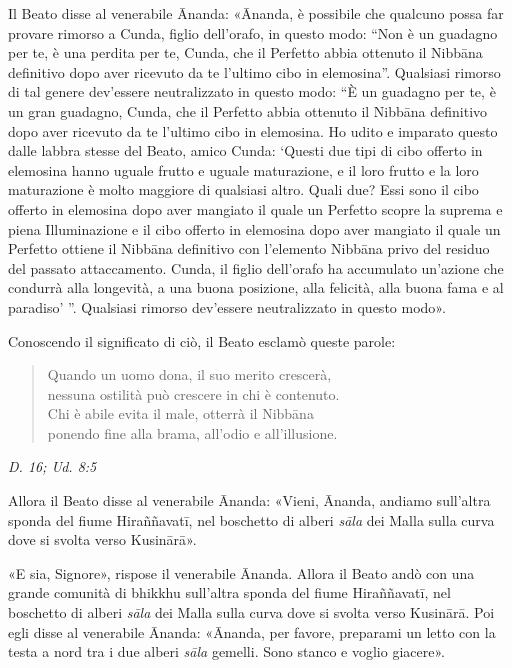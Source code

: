 Il Beato disse al venerabile Ānanda: «Ānanda, è possibile che qualcuno
possa far provare rimorso a Cunda, figlio dell’orafo, in questo modo:
“Non è un guadagno per te, è una perdita per te, Cunda, che il Perfetto
abbia ottenuto il Nibbāna definitivo dopo aver ricevuto da te l’ultimo
cibo in elemosina”. Qualsiasi rimorso di tal genere dev’essere
neutralizzato in questo modo: “È un guadagno per te, è un gran guadagno,
Cunda, che il Perfetto abbia ottenuto il Nibbāna definitivo dopo aver
ricevuto da te l’ultimo cibo in elemosina. Ho udito e imparato questo
dalle labbra stesse del Beato, amico Cunda: ‘Questi due tipi di cibo
offerto in elemosina hanno uguale frutto e uguale maturazione, e il loro
frutto e la loro maturazione è molto maggiore di qualsiasi altro. Quali
due? Essi sono il cibo offerto in elemosina dopo aver mangiato il quale
un Perfetto scopre la suprema e piena Illuminazione e il cibo offerto in
elemosina dopo aver mangiato il quale un Perfetto ottiene il Nibbāna
definitivo con l’elemento Nibbāna privo del residuo del passato
attaccamento. Cunda, il figlio dell’orafo ha accumulato un’azione che
condurrà alla longevità, a una buona posizione, alla felicità, alla
buona fama e al paradiso’ ”. Qualsiasi rimorso dev’essere neutralizzato
in questo modo».


Conoscendo il significato di ciò, il Beato esclamò queste parole:


\begin{quote}
Quando un uomo dona, il suo merito crescerà, \\
nessuna ostilità può crescere in chi è contenuto. \\
Chi è abile evita il male, otterrà il Nibbāna \\
ponendo fine alla brama, all’odio e all’illusione.
\end{quote}

\emph{D. 16; Ud. 8:5}


Allora il Beato disse al venerabile Ānanda: «Vieni, Ānanda, andiamo
sull’altra sponda del fiume Hiraññavatī, nel boschetto di alberi \emph{sāla}
dei Malla sulla curva dove si svolta verso Kusinārā».


«E sia, Signore», rispose il venerabile Ānanda. Allora il Beato andò con
una grande comunità di bhikkhu sull’altra sponda del fiume Hiraññavatī,
nel boschetto di alberi \emph{sāla} dei Malla sulla curva dove si svolta
verso Kusinārā. Poi egli disse al venerabile Ānanda: «Ānanda, per
favore, preparami un letto con la testa a nord tra i due alberi \emph{sāla}
gemelli. Sono stanco e voglio giacere».


